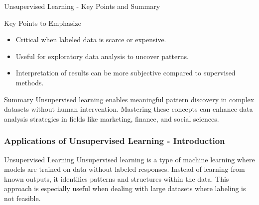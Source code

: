 \documentclass[aspectratio=169]{beamer}
\begin{document}
\begin{frame}[fragile]{Unsupervised Learning - Key Points and Summary}
  \begin{block}{Key Points to Emphasize}
    \begin{itemize}
      \item Critical when labeled data is scarce or expensive.
      \item Useful for exploratory data analysis to uncover patterns.
      \item Interpretation of results can be more subjective compared to supervised methods.
    \end{itemize}
  \end{block}
  
  \begin{block}{Summary}
    Unsupervised learning enables meaningful pattern discovery in complex datasets without human intervention. Mastering these concepts can enhance data analysis strategies in fields like marketing, finance, and social sciences.
  \end{block}
\end{frame}

\begin{frame}[fragile]
    \frametitle{Applications of Unsupervised Learning - Introduction}
    \begin{block}{Unsupervised Learning}
        Unsupervised learning is a type of machine learning where models are trained on data without labeled responses. 
        Instead of learning from known outputs, it identifies patterns and structures within the data. 
        This approach is especially useful when dealing with large datasets where labeling is not feasible.
    \end{block}
\end{frame}
\end{document}
